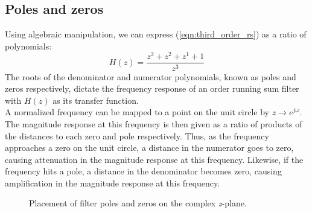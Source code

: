 \documentclass[journal]{IEEEtran}
\begin{document}
\subsection{Poles and zeros}
Using algebraic manipulation, we can express (\ref{eqn:third_order_rs}) as a ratio of polynomials:  
\begin{equation}
\label{eqn:third_order_rs_tf}
    H(z) = \frac{z^3+z^2+z^1+1}{z^3}
\end{equation}
The roots of the denominator and numerator polynomials, known as poles and zeros respectively, dictate the frequency response of an  order running sum filter with $H(z)$ as its transfer function. \\
A normalized frequency can be mapped to a point on the unit circle by $z \rightarrow e^{j \omega}$. The magnitude response at this frequency is then given as a ratio of products of the distances to each zero and pole respectively. Thus, as the frequency approaches a zero on the unit circle, a distance in the numerator goes to zero, causing attenuation in the magnitude response at this frequency. Likewise, if the frequency hits a pole, a distance in the denominator becomes zero, causing amplification in the magnitude response at this frequency. \\
\begin{figure}[H]
    \centering
    \captionsetup[subfloat]{farskip=0pt,captionskip=0pt}
    \caption{Placement of filter poles and zeros on the complex \textit{z}-plane.}
    \label{fig:zplane}
\end{figure}
\end{document}
